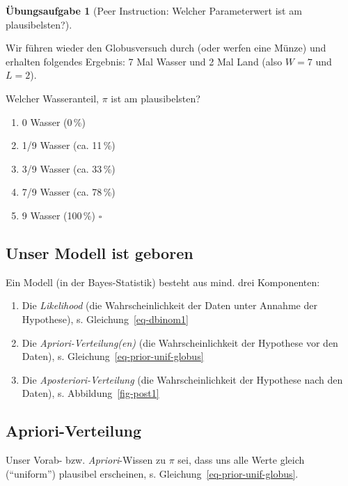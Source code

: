 \documentclass[
  ngerman,
  letterpaper,
  twoside,
  open=any]{scrbook}
\providecommand{\tightlist}{%
  \setlength{\itemsep}{0pt}\setlength{\parskip}{0pt}}\usepackage{longtable,booktabs,array}
\theoremstyle{definition}
\theoremstyle{plain}
\theoremstyle{definition}
\newtheorem{exercise}{Übungsaufgabe}[chapter]
\theoremstyle{definition}
\theoremstyle{definition}
\theoremstyle{definition}
\newtheorem{exercise}{Übungsaufgabe}[chapter]
\theoremstyle{remark}
\begin{document}
\begin{exercise}[Peer Instruction: Welcher Parameterwert ist am
plausibelsten?]\protect\hypertarget{exr-globus}{}\label{exr-globus}

Wir führen wieder den Globusversuch durch (oder werfen eine Münze) und
erhalten folgendes Ergebnis: 7 Mal Wasser und 2 Mal Land (also \(W=7\)
und \(L=2\)).

Welcher Wasseranteil, \(\pi\) ist am plausibelsten?

\begin{enumerate}
\def\labelenumi{\Alph{enumi})}
\tightlist
\item
  0 Wasser (0\,\%)
\item
  1/9 Wasser (ca. 11\,\%)
\item
  3/9 Wasser (ca. 33\,\%)
\item
  7/9 Wasser (ca. 78\,\%)
\item
  9 Wasser (100\,\%) \(\square\)
\end{enumerate}

\end{exercise}

\subsection{Unser Modell ist geboren}\label{unser-modell-ist-geboren}

Ein Modell (in der Bayes-Statistik) besteht aus mind. drei Komponenten:

\begin{enumerate}
\def\labelenumi{\arabic{enumi}.}
\tightlist
\item
  Die \emph{Likelihood} (die Wahrscheinlichkeit der Daten unter Annahme
  der Hypothese), s. Gleichung~\ref{eq-dbinom1}
\item
  Die \emph{Apriori-Verteilung(en)} (die Wahrscheinlichkeit der
  Hypothese vor den Daten), s. Gleichung~\ref{eq-prior-unif-globus}
\item
  Die \emph{Aposteriori-Verteilung} (die Wahrscheinlichkeit der
  Hypothese nach den Daten), s. Abbildung~\ref{fig-post1}
\end{enumerate}

\subsection{Apriori-Verteilung}\label{apriori-verteilung-1}

Unser Vorab- bzw. \emph{Apriori}-Wissen zu \(\pi\) sei, dass uns alle
Werte gleich (\enquote{uniform}) plausibel erscheinen, s.
Gleichung~\ref{eq-prior-unif-globus}.
\end{document}
